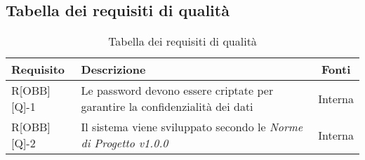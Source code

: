 \subsection{Tabella dei requisiti di qualità}

\begin{center}
	\begin{table}[h]
	\begin{tabular}{|l|p{}|c|}
		\toprule
		
		\textbf{Requisito} & \textbf{Descrizione} & \textbf{Fonti} \\
		
		\midrule
		R[OBB][Q]-1	& Le password devono essere criptate per garantire la confidenzialità dei dati & Interna \\ \midrule
		R[OBB][Q]-2 & Il sistema viene sviluppato secondo le \textit{Norme di Progetto v1.0.0} & Interna \\
		
		\bottomrule

	\end{tabular}
	\caption{Tabella dei requisiti di qualità}
	
	\end{table}
\end{center}
\newpage